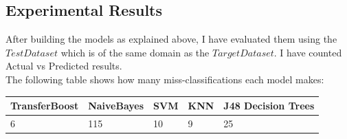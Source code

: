 \documentclass[a4paper,12pt, english]{article}
\begin{document}
\subsection{Experimental Results}
After building the models as explained above, I have evaluated them using the $Test Dataset$ which is of the same domain as the $Target Dataset$. I have counted Actual vs Predicted results.\\
The following table shows how many miss-classifications each model makes:\\ 
\begin{center}
    \begin{tabular}{ | l | l | l | p{5cm} | l |}
    \hline
    TransferBoost & NaiveBayes & SVM & KNN & J48 Decision Trees \\ \hline
    6 & 115 & 10 & 9 & 25\\
    \hline
    \end{tabular}       
\end{center}
\end{document}
